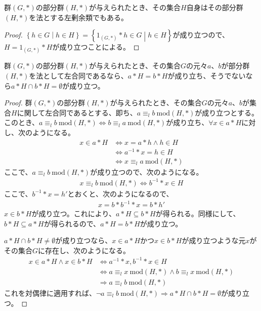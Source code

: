 \documentclass[dvipdfmx]{jsarticle}
\begin{document}
\begin{thm}\label{3.1.1.14}
群$(G,*)$の部分群$(H,*)$が与えられたとき、その集合$H$自身はその部分群$(H,*)$を法とする左剰余類でもある。
\end{thm}
\begin{proof}
$\left\{ h \in G \middle| h \in H \right\} = \left\{ 1_{(G,*)}*h \in G \middle| h \in H \right\}$が成り立つので、$H = 1_{(G,*)}*H$が成り立つことによる。
\end{proof}
\begin{thm}\label{3.1.1.15}
群$(G,*)$の部分群$(H,*)$が与えられたとき、その集合$G$の元々$a$、$b$が部分群$(H,*)$を法として左合同であるなら、$a*H = b*H$が成り立ち、そうでないなら$a*H \cap b*H = \emptyset $が成り立つ。
\end{thm}
\begin{proof}
群$(G,*)$の部分群$(H,*)$が与えられたとき、その集合$G$の元々$a$、$b$が集合$H$に関して左合同であるとする、即ち、$a \equiv_{l}b\ \mathrm{mod}(H,*)$が成り立つとする。このとき、$a \equiv_{l}b\ \mathrm{mod}(H,*) \Leftrightarrow b \equiv_{l}a\ \mathrm{mod}(H,*)$が成り立ち、$\forall x \in a*H$に対し、次のようになる。
\begin{align*}
x \in a*H &\Leftrightarrow x = a*h \land h \in H\\
&\Leftrightarrow a^{- 1}*x = h \in H\\
&\Leftrightarrow x \equiv_{l}a\ \mathrm{mod}(H,*)
\end{align*}
ここで、$a \equiv_{l}b\ \mathrm{mod}(H,*)$が成り立つので、次のようになる。
\begin{align*}
x \equiv_{l}b\ \mathrm{mod}(H,*) \Leftrightarrow b^{- 1}*x \in H
\end{align*}
ここで、$b^{- 1}*x = h'$とおくと、次のようになるので、
\begin{align*}
x = b*b^{- 1}*x = b*h'
\end{align*}
$x \in b*H$が成り立つ。これにより、$a*H \subseteq b*H$が得られる。同様にして、$b*H \subseteq a*H$が得られるので、$a*H = b*H$が成り立つ。\par
$a*H \cap b*H \neq \emptyset $が成り立つなら、$x \in a*H$かつ$x \in b*H$が成り立つような元$x$がその集合$G$に存在し、次のようになる。
\begin{align*}
x \in a*H \land x \in b*H &\Leftrightarrow a^{- 1}*x,b^{- 1}*x \in H\\
&\Leftrightarrow a \equiv_{l}x\ \mathrm{mod}(H,*) \land b \equiv_{l}x\ \mathrm{mod}(H,*)\\
&\Rightarrow a \equiv_{l}b\ \mathrm{mod}(H,*)
\end{align*}
これを対偶律に適用すれば、$\neg a \equiv_{l}b\ \mathrm{mod}(H,*) \Rightarrow a*H \cap b*H = \emptyset $が成り立つ。
\end{proof}
\end{document}
